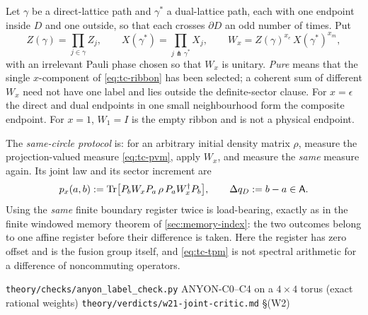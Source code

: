 \begin{definition}
Let $\gamma$ be a direct-lattice path and $\gamma^{*}$ a dual-lattice path,
each with one endpoint inside $D$ and one outside, so that each crosses
$\partial D$ an odd number of times. Put
\begin{equation}
  Z(\gamma)=\prod_{j\in\gamma}Z_j,
  \qquad
  X(\gamma^{*})=\prod_{j\pitchfork\gamma^{*}}X_j,
  \qquad
  W_x=Z(\gamma)^{x_e}\,X(\gamma^{*})^{x_m},
  \label{eq:tc-ribbon}
\end{equation}
with an irrelevant Pauli phase chosen so that $W_x$ is unitary. \emph{Pure}
means that the single $x$-component of \eqref{eq:tc-ribbon} has been selected;
a coherent sum of different $W_x$ need not have one label and lies outside the
definite-sector clause. For $x=\epsilon$ the direct and dual endpoints in one
small neighbourhood form the composite endpoint. For $x=1$, $W_1=I$ is the
empty ribbon and is not a physical endpoint.

The \emph{same-circle protocol} is: for an arbitrary initial density matrix
$\rho$, measure the projection-valued measure \eqref{eq:tc-pvm}, apply $W_x$,
and measure the \emph{same} measure again. Its joint law and its sector
increment are
\begin{equation}
  p_x(a,b):=\operatorname{Tr}\bigl[P_bW_xP_a\,\rho\,P_aW_x^{\dagger}P_b\bigr],
  \qquad
  \Delta q_D:=b-a\in\mathsf{A} .
  \label{eq:tc-tpm}
\end{equation}
Using the \emph{same} finite boundary register twice is load-bearing, exactly
as in the finite windowed memory theorem of \cref{sec:memory-index}: the two
outcomes belong to one affine register before their difference is taken. Here
the register has zero offset and is the fusion group itself, and
\eqref{eq:tc-tpm} is not spectral arithmetic for a difference of noncommuting
operators.
\end{definition}

%
{\texttt{theory/checks/anyon\_label\_check.py} ANYON-C0--C4 on a $4\times4$
torus (exact rational weights)}%
{\texttt{theory/verdicts/w21-joint-critic.md} \S(W2)}

